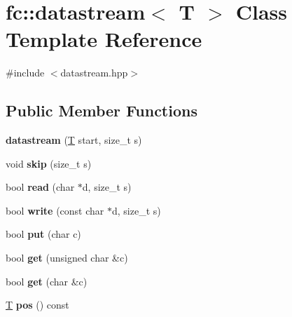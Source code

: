 \hypertarget{classfc_1_1datastream}{}\section{fc\+:\+:datastream$<$ T $>$ Class Template Reference}
\label{classfc_1_1datastream}


{\ttfamily \#include $<$datastream.\+hpp$>$}

\subsection*{Public Member Functions}
\begin{DoxyCompactItemize}
\item 
\mbox{\label{classfc_1_1datastream_af3d9ff32d9d0099aa0e1fe2b32c27b52}} 
{\bfseries datastream} (\mbox{\hyperlink{struct_t}{T}} start, size\+\_\+t s)
\item 
\mbox{\label{classfc_1_1datastream_addcb56875ba172e946176d61545c7566}} 
void {\bfseries skip} (size\+\_\+t s)
\item 
\mbox{\label{classfc_1_1datastream_a214be629f6d6d28b77e530064808f215}} 
bool {\bfseries read} (char $\ast$d, size\+\_\+t s)
\item 
\mbox{\label{classfc_1_1datastream_a34e2e9b2ff52859f6b642a1ea2d2de40}} 
bool {\bfseries write} (const char $\ast$d, size\+\_\+t s)
\item 
\mbox{\label{classfc_1_1datastream_a2273101ec71ad8ca79ceed3496551bfc}} 
bool {\bfseries put} (char c)
\item 
\mbox{\label{classfc_1_1datastream_a3b4ab7cddb2b1bf508a50ff071838a17}} 
bool {\bfseries get} (unsigned char \&c)
\item 
\mbox{\label{classfc_1_1datastream_a5d4302e97258dc8e544b180de7bbe047}} 
bool {\bfseries get} (char \&c)
\item 
\mbox{\label{classfc_1_1datastream_ad9a1c2df6a42a62e2d027d4892d5fc44}} 
\mbox{\hyperlink{struct_t}{T}} {\bfseries pos} () const

\end{DoxyCompactItemize}
